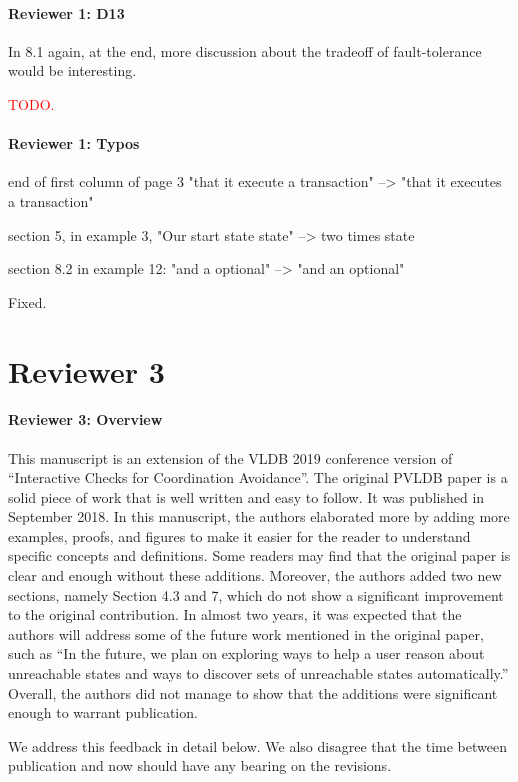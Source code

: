 \documentclass[9pt]{article}
\begin{document}
\begin{multicols*}{2}
\paragraph{Reviewer 1: D13}
\begin{feedback}
  In 8.1 again, at the end, more discussion about the tradeoff of
  fault-tolerance would be interesting.
\end{feedback}
\textcolor{red}{TODO.}

\paragraph{Reviewer 1: Typos}
\begin{feedback}
  end of first column of page 3 "that it execute a transaction" --> "that it
  executes a transaction"

  section 5, in example 3, "Our start state state" --> two times state

  section 8.2 in example 12: "and a optional" --> "and an optional"
\end{feedback}
Fixed.

\section*{Reviewer 3}
\paragraph{Reviewer 3: Overview}
\begin{feedback}
  This manuscript is an extension of the VLDB 2019 conference version of
  ``Interactive Checks for Coordination Avoidance''. The original PVLDB paper
  is a solid piece of work that is well written and easy to follow. It was
  published in September 2018. In this manuscript, the authors elaborated more
  by adding more examples, proofs, and figures to make it easier for the reader
  to understand specific concepts and definitions. Some readers may find that
  the original paper is clear and enough without these additions. Moreover, the
  authors added two new sections, namely Section 4.3 and 7, which do not show a
  significant improvement to the original contribution. In almost two years, it
  was expected that the authors will address some of the future work mentioned
  in the original paper, such as ``In the future, we plan on exploring ways to
  help a user reason about unreachable states and ways to discover sets of
  unreachable states automatically.'' Overall, the authors did not manage to
  show that the additions were significant enough to warrant publication.
\end{feedback}
We address this feedback in detail below. We also disagree that the time
between publication and now should have any bearing on the revisions.


\end{multicols*}
\end{document}
